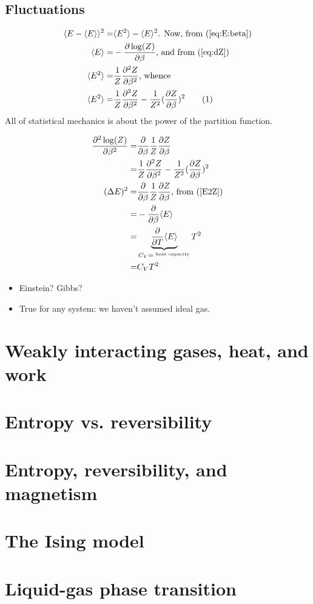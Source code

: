 \documentclass[]{article}
\newcommand\numberthis{\addtocounter{equation}{1}\tag{\theequation}}
\begin{document}
\subsection{Fluctuations}

\begin{align*}
	\langle E -  \langle E \rangle \rangle^2 =& \langle E^2 \rangle - \langle E \rangle^2\text{. Now, from (\ref{eq:E:beta})}\\
	\langle E \rangle=& - \frac{\partial \log(Z)}{\partial \beta}\text{, and from (\ref{eq:dZ})}\\
	 \langle E^2 \rangle =& \frac{1}{Z} \frac{\partial^2 Z}{\partial \beta^2} \text{, whence}\\
	 \langle E^2 \rangle =& \frac{1}{Z} \frac{\partial^2 Z}{\partial \beta^2} - \frac{1}{Z^2} (\frac{\partial Z}{\partial \beta})^2 \numberthis \label{E2Z}
\end{align*}
All of statistical mechanics is about the power of the partition function.

\begin{align*}
	\frac{\partial^2 \log(Z)}{\partial \beta^2} =& \frac{\partial}{\partial \beta} \frac{1}{Z} \frac{\partial Z}{\partial \beta}\\
	=& \frac{1}{Z} \frac{\partial^2 Z}{\partial \beta^2} - \frac{1}{Z^2} (\frac{\partial Z}{\partial \beta})^2\\
	(\Delta E)^2 =& \frac{\partial}{\partial \beta} \frac{1}{Z} \frac{\partial Z}{\partial \beta}\text{, from (\ref{E2Z})}\\
	=& - \frac{\partial}{\partial \beta} \langle E \rangle\\
	=&  \underbrace{\frac{\partial}{\partial T} \langle E \rangle}_{C_V=^\text{ heat capacity}} T^2\\
	=& C_V T^2
\end{align*}

\begin{itemize}
	\item Einstein? Gibbs?
	\item True for any system: we haven't assumed ideal gas.
\end{itemize}


\section{Weakly interacting gases, heat, and work}


\section{Entropy vs. reversibility}


\section{Entropy, reversibility, and magnetism}


\section{The Ising model}


\section{Liquid-gas phase transition}
\end{document}

